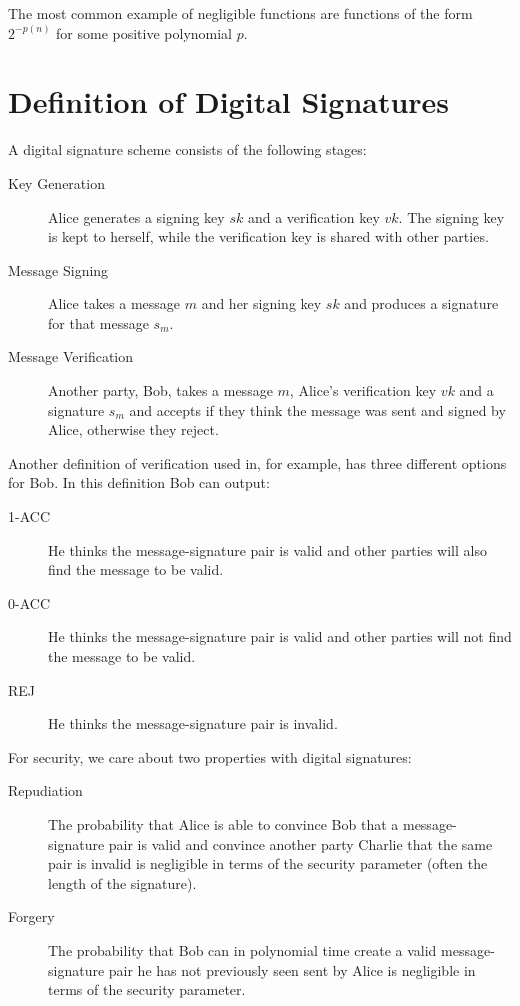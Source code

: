 \documentclass[%
 reprint,
 amsmath,amssymb,
 aps,
 pra,
]{revtex4-1}
\begin{document}
The most common example of negligible functions are functions of the form $2^{-p(n)}$ for some positive polynomial $p$.

\section{Definition of Digital Signatures}
\label{sec:def}

A digital signature scheme consists of the following stages:

\begin{description}
\item[Key Generation]Alice generates a signing key $sk$ and a verification key $vk$. The signing key is kept to herself, while the verification key is shared with other parties.
\item[Message Signing]Alice takes a message $m$ and her signing key $sk$ and produces a signature for that message $s_m$.
\item[Message Verification]Another party, Bob, takes a message $m$, Alice's verification key $vk$ and a signature $s_m$ and accepts if they think the message was sent and signed by Alice, otherwise they reject.
\end{description}

Another definition of verification used in, for example, \cite{quant-ph/0105032} has three different options for Bob. In this definition Bob can output:

\begin{description}
\item[1-ACC]He thinks the message-signature pair is valid and other parties will also find the message to be valid.
\item[0-ACC]He thinks the message-signature pair is valid and other parties will not find the message to be valid.
\item[REJ]He thinks the message-signature pair is invalid.
\end{description}

For security, we care about two properties with digital signatures:

\begin{description}
\item[Repudiation]The probability that Alice is able to convince Bob that a message-signature pair is valid and convince another party Charlie that the same pair is invalid is negligible in terms of the security parameter (often the length of the signature).
\item[Forgery]The probability that Bob can in polynomial time create a valid message-signature pair he has not previously seen sent by Alice is negligible in terms of the security parameter.
\end{description}
\end{document}

